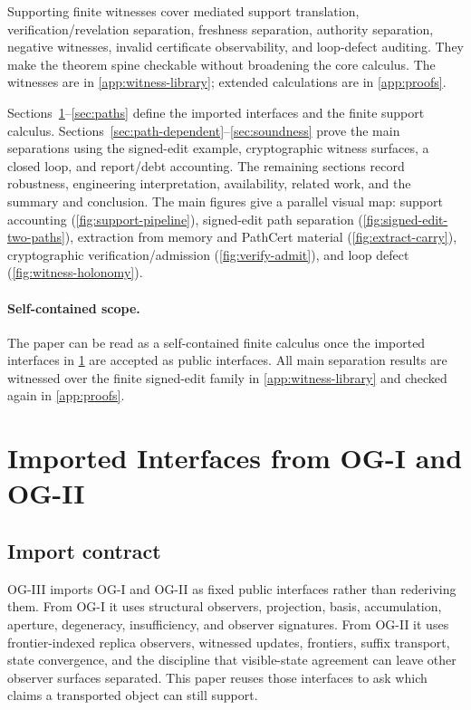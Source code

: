 \documentclass[11pt,twoside]{article}
\theoremstyle{definition}
\begin{document}
Supporting finite witnesses cover mediated support translation,
verification/revelation separation, freshness separation, authority separation,
negative witnesses, invalid certificate observability, and loop-defect auditing.
They make the theorem spine checkable without broadening the core calculus. The
witnesses are in \cref{app:witness-library}; extended calculations are in
\cref{app:proofs}.

Sections~\ref{sec:imports}--\ref{sec:paths} define the imported interfaces and
the finite support calculus. Sections~\ref{sec:path-dependent}--\ref{sec:soundness}
prove the main separations using the signed-edit example, cryptographic witness
surfaces, a closed loop, and report/debt accounting. The remaining sections
record robustness, engineering interpretation, availability, related work, and
the summary and conclusion.
The main figures give a parallel visual map: support accounting
(\cref{fig:support-pipeline}), signed-edit path separation
(\cref{fig:signed-edit-two-paths}), extraction from memory and PathCert
material (\cref{fig:extract-carry}), cryptographic verification/admission
(\cref{fig:verify-admit}), and loop defect (\cref{fig:witness-holonomy}).

\paragraph{Self-contained scope.}
The paper can be read as a self-contained finite calculus once the imported
interfaces in \cref{sec:imports} are accepted as public interfaces. All main
separation results are witnessed over the finite signed-edit family in
\cref{app:witness-library} and checked again in \cref{app:proofs}.

\section{Imported Interfaces from OG-I and OG-II}
\label{sec:imports}

\subsection{Import contract}

OG-III imports OG-I and OG-II as fixed public interfaces rather than rederiving
them. From OG-I it uses structural observers, projection, basis, accumulation,
aperture, degeneracy, insufficiency, and observer signatures. From OG-II it uses
frontier-indexed replica observers, witnessed updates, frontiers, suffix
transport, state convergence, and the discipline that visible-state agreement
can leave other observer surfaces separated. This paper reuses those interfaces
to ask which claims a transported object can still support.
\end{document}

